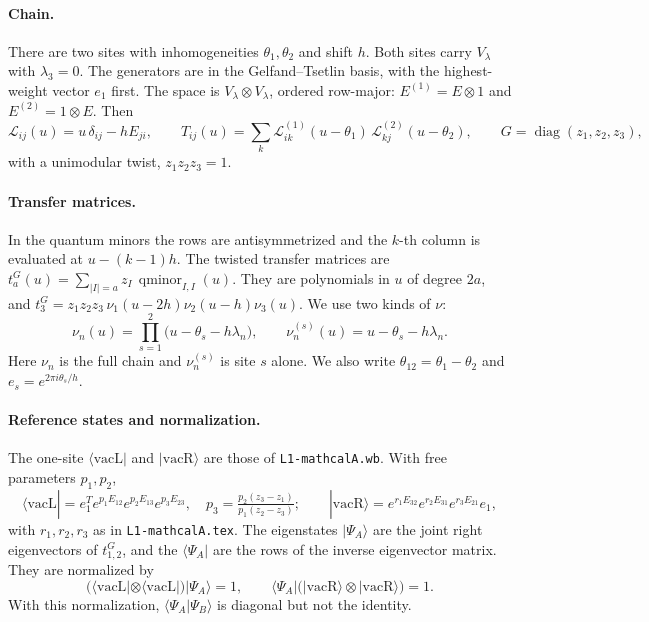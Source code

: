 \documentclass[11pt]{article}
\newcommand{\vacL}{\langle\mathrm{vacL}|}
\newcommand{\vacR}{|\mathrm{vacR}\rangle}
\newcommand{\qmin}{\operatorname{qminor}}
\newcommand{\nb}[1]{\texttt{#1}}
\theoremstyle{definition}
\theoremstyle{remark}
\begin{document}
\paragraph{Chain.}
There are two sites with inhomogeneities $\theta_1,\theta_2$ and shift $h$. Both sites carry $V_\lambda$ with $\lambda_3=0$. The generators are in the Gelfand--Tsetlin basis, with the highest-weight vector $e_1$ first. The space is $V_\lambda\otimes V_\lambda$, ordered row-major: $E^{(1)}=E\otimes1$ and $E^{(2)}=1\otimes E$. Then
\begin{equation}
\mathcal L_{ij}(u)=u\,\delta_{ij}-hE_{ji},\qquad
T_{ij}(u)=\sum_k\mathcal L^{(1)}_{ik}(u-\theta_1)\,\mathcal L^{(2)}_{kj}(u-\theta_2),\qquad G=\operatorname{diag}(z_1,z_2,z_3),
\end{equation}
with a unimodular twist, $z_1z_2z_3=1$.

\paragraph{Transfer matrices.}
In the quantum minors the rows are antisymmetrized and the $k$-th column is evaluated at $u-(k-1)h$. The twisted transfer matrices are $t^G_a(u)=\sum_{|I|=a}z_I\,\qmin_{I,I}(u)$. They are polynomials in $u$ of degree $2a$, and $t^G_3=z_1z_2z_3\,\nu_1(u-2h)\nu_2(u-h)\nu_3(u)$. We use two kinds of $\nu$:
\begin{equation}
\nu_n(u)=\prod_{s=1}^2\big(u-\theta_s-h\lambda_n\big),\qquad \nu^{(s)}_n(u)=u-\theta_s-h\lambda_n .
\end{equation}
Here $\nu_n$ is the full chain and $\nu^{(s)}_n$ is site $s$ alone. We also write $\theta_{12}=\theta_1-\theta_2$ and $e_s=e^{2\pi i\theta_s/h}$.

\paragraph{Reference states and normalization.}
The one-site $\vacL$ and $\vacR$ are those of \nb{L1-mathcalA.wb}. With free parameters $p_1,p_2$,
\begin{equation}
\vacL=e_1^Te^{p_1E_{12}}e^{p_2E_{13}}e^{p_3E_{23}},\quad p_3=\tfrac{p_2(z_3-z_1)}{p_1(z_2-z_3)};\qquad
\vacR=e^{r_1E_{32}}e^{r_2E_{31}}e^{r_3E_{21}}e_1,
\end{equation}
with $r_1,r_2,r_3$ as in \nb{L1-mathcalA.tex}. The eigenstates $|\Psi_A\rangle$ are the joint right eigenvectors of $t^G_{1,2}$, and the $\langle\Psi_A|$ are the rows of the inverse eigenvector matrix. They are normalized by
\begin{equation}
\big(\vacL\otimes\vacL\big)|\Psi_A\rangle=1,\qquad \langle\Psi_A|\big(\vacR\otimes\vacR\big)=1 .
\end{equation}
With this normalization, $\langle\Psi_A|\Psi_B\rangle$ is diagonal but not the identity.
\end{document}
